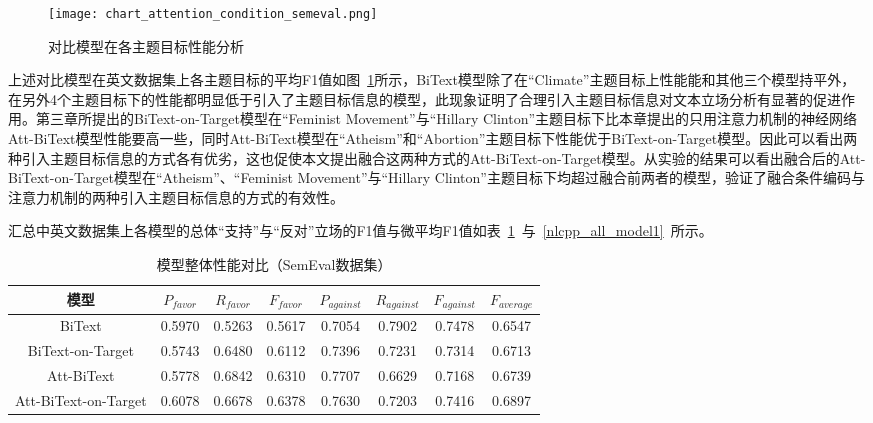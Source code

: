 \begin{figure}[htbp]
	\centering
	\texttt{[image: chart\_attention\_condition\_semeval.png]}
	\caption[rnn_vanish]{对比模型在各主题目标性能分析}
	\label{chart_attention_condition_semeval}
\end{figure}
上述对比模型在英文数据集上各主题目标的平均F1值如图~\ref{chart_attention_condition_semeval}所示，BiText模型除了在“Climate”主题目标上性能能和其他三个模型持平外，在另外4个主题目标下的性能都明显低于引入了主题目标信息的模型，此现象证明了合理引入主题目标信息对文本立场分析有显著的促进作用。第三章所提出的BiText-on-Target模型在“Feminist Movement”与“Hillary Clinton”主题目标下比本章提出的只用注意力机制的神经网络Att-BiText模型性能要高一些，同时Att-BiText模型在“Atheism”和“Abortion”主题目标下性能优于BiText-on-Target模型。因此可以看出两种引入主题目标信息的方式各有优劣，这也促使本文提出融合这两种方式的Att-BiText-on-Target模型。从实验的结果可以看出融合后的Att-BiText-on-Target模型在“Atheism”、“Feminist Movement”与“Hillary Clinton”主题目标下均超过融合前两者的模型，验证了融合条件编码与注意力机制的两种引入主题目标信息的方式的有效性。

汇总中英文数据集上各模型的总体“支持”与“反对”立场的F1值与微平均F1值如表~\ref{semeval_all_model1}~与~\ref{nlcpp_all_model1}~所示。
\begin{table}[htbp]
	\caption[table123]{模型整体性能对比（SemEval数据集）}
	\label{semeval_all_model1}
	\vspace{0.5em}\centering\wuhao
	\begin{tabular}{cccccccc}
		\toprule[1.5pt]
		模型& $P_{favor}$&$R_{favor}$&$F_{favor}$&$P_{against}$&$R_{against}$&$F_{against}$&$F_{average}$ \\
		\midrule[1pt]
		BiText&0.5970&0.5263&0.5617&0.7054&0.7902&0.7478&0.6547\\
		BiText-on-Target&0.5743&0.6480&0.6112&0.7396&0.7231&0.7314&0.6713\\
		Att-BiText&0.5778&0.6842&0.6310&0.7707&0.6629&0.7168&0.6739\\
		Att-BiText-on-Target&0.6078&0.6678&0.6378&0.7630&0.7203&0.7416&0.6897\\
		\bottomrule[1.5pt]
	\end{tabular}
\end{table}

